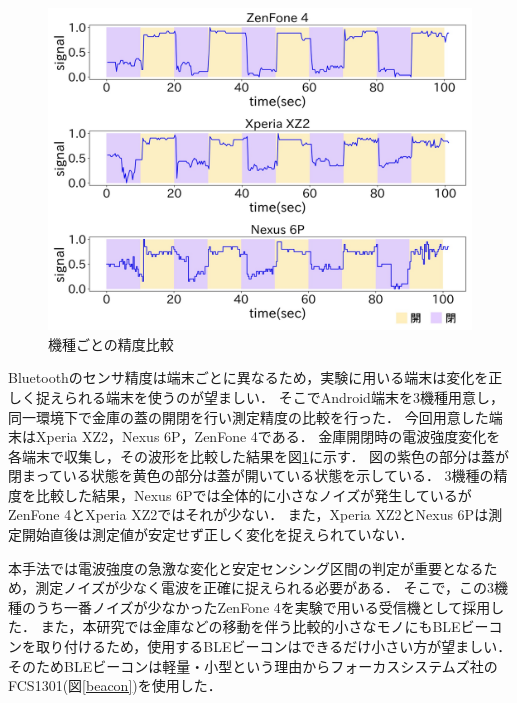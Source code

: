 \begin{figure}[tbh]
    \centering
    \includegraphics[width=14cm]{images/chapter3/mix.jpg}
    \caption{機種ごとの精度比較}
    \label{multi-data}
\end{figure}

Bluetoothのセンサ精度は端末ごとに異なるため，実験に用いる端末は変化を正しく捉えられる端末を使うのが望ましい．
そこでAndroid端末を3機種用意し，同一環境下で金庫の蓋の開閉を行い測定精度の比較を行った．
今回用意した端末はXperia XZ2，Nexus 6P，ZenFone 4である．
金庫開閉時の電波強度変化を各端末で収集し，その波形を比較した結果を図\ref{multi-data}に示す．
図の紫色の部分は蓋が閉まっている状態を黄色の部分は蓋が開いている状態を示している．
3機種の精度を比較した結果，Nexus 6Pでは全体的に小さなノイズが発生しているがZenFone 4とXperia XZ2ではそれが少ない．
また，Xperia XZ2とNexus 6Pは測定開始直後は測定値が安定せず正しく変化を捉えられていない．

本手法では電波強度の急激な変化と安定センシング区間の判定が重要となるため，測定ノイズが少なく電波を正確に捉えられる必要がある．
そこで，この3機種のうち一番ノイズが少なかったZenFone 4を実験で用いる受信機として採用した．
また，本研究では金庫などの移動を伴う比較的小さなモノにもBLEビーコンを取り付けるため，使用するBLEビーコンはできるだけ小さい方が望ましい．
そのためBLEビーコンは軽量・小型という理由からフォーカスシステムズ社のFCS1301(図\ref{beacon})を使用した．


